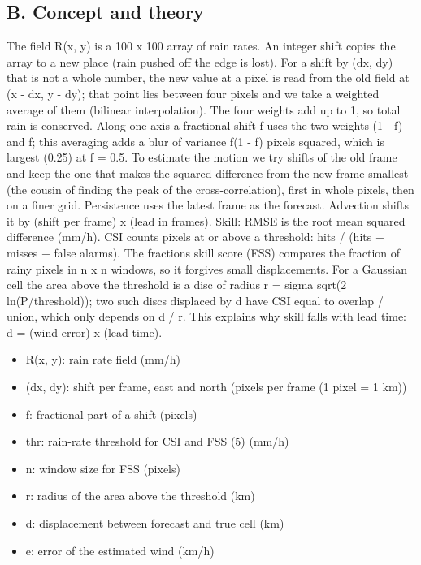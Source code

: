 \documentclass[11pt,a4paper]{article}
\begin{document}
\subsection*{B. Concept and theory}
The field R(x, y) is a 100 x 100 array of rain rates. An integer shift copies the array to a new place (rain pushed off the edge is lost). For a shift by (dx, dy) that is not a whole number, the new value at a pixel is read from the old field at (x - dx, y - dy); that point lies between four pixels and we take a weighted average of them (bilinear interpolation). The four weights add up to 1, so total rain is conserved. Along one axis a fractional shift f uses the two weights (1 - f) and f; this averaging adds a blur of variance f(1 - f) pixels squared, which is largest (0.25) at f = 0.5. To estimate the motion we try shifts of the old frame and keep the one that makes the squared difference from the new frame smallest (the cousin of finding the peak of the cross-correlation), first in whole pixels, then on a finer grid. Persistence uses the latest frame as the forecast. Advection shifts it by (shift per frame) x (lead in frames). Skill: RMSE is the root mean squared difference (mm/h). CSI counts pixels at or above a threshold: hits / (hits + misses + false alarms). The fractions skill score (FSS) compares the fraction of rainy pixels in n x n windows, so it forgives small displacements. For a Gaussian cell the area above the threshold is a disc of radius r = sigma sqrt(2 ln(P/threshold)); two such discs displaced by d have CSI equal to overlap / union, which only depends on d / r. This explains why skill falls with lead time: d = (wind error) x (lead time).

\begin{itemize}[nosep]
\item R(x, y): rain rate field (mm/h)
\item (dx, dy): shift per frame, east and north (pixels per frame (1 pixel = 1 km))
\item f: fractional part of a shift (pixels)
\item thr: rain-rate threshold for CSI and FSS (5) (mm/h)
\item n: window size for FSS (pixels)
\item r: radius of the area above the threshold (km)
\item d: displacement between forecast and true cell (km)
\item e: error of the estimated wind (km/h)
\end{itemize}
\end{document}
